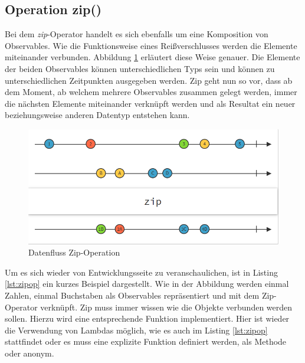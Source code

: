 \subsection{Operation zip()}
Bei dem \textit{zip}-Operator handelt es sich ebenfalls um eine Komposition von Observables. Wie die Funktionsweise eines Reißverschlusses werden die Elemente miteinander verbunden. Abbildung \ref{pic:zipop} erläutert diese Weise genauer. Die Elemente der beiden Observables können unterschiedlichen Typs sein und können zu unterschiedlichen Zeitpunkten ausgegeben werden. Zip geht nun so vor, dass ab dem Moment, ab welchem mehrere Observables zusammen gelegt werden, immer die nächsten Elemente miteinander verknüpft werden und als Resultat ein neuer beziehungsweise anderen Datentyp entstehen kann.
\begin{figure}[hbt]
	\centering
	\includegraphics[width=1\textwidth]{Abb/zip}
	\caption{Datenfluss Zip-Operation}
	\label{pic:zipop}
\end{figure}
 
Um es sich wieder von Entwicklungsseite zu veranschaulichen, ist in Listing \ref{lst:zipop} ein kurzes Beispiel dargestellt. Wie in der Abbildung werden einmal Zahlen, einmal Buchstaben als Observables repräsentiert und mit dem Zip-Operator verknüpft. Zip muss immer wissen wie die Objekte verbunden werden sollen. Hierzu wird eine entsprechende Funktion implementiert. Hier ist wieder die Verwendung von Lambdas möglich, wie es auch im Listing \ref{lst:zipop} stattfindet oder es muss eine explizite Funktion definiert werden, als Methode oder anonym. 